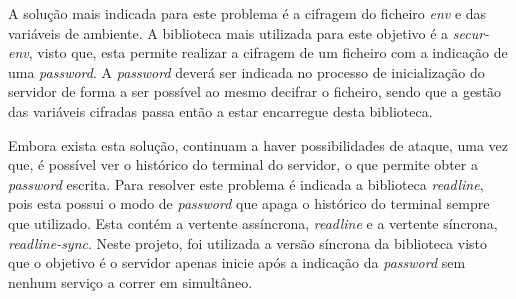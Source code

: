 A solução mais indicada para este problema é a cifragem do ficheiro \textit{env} e das variáveis de ambiente. A biblioteca mais utilizada para este objetivo é a \textit{secur-env}, visto que, esta permite realizar a cifragem de um ficheiro com a indicação de uma \textit{\textit{password}}. A \textit{\textit{password}} deverá ser indicada no processo de inicialização do servidor de forma a ser possível ao mesmo decifrar o ficheiro, sendo que a gestão das variáveis cifradas passa então a estar encarregue desta biblioteca.

Embora exista esta solução, continuam a haver possibilidades de ataque, uma vez que, é possível ver o histórico do terminal do servidor, o que permite obter a \textit{\textit{password}} escrita. Para resolver este problema é indicada a biblioteca \textit{readline}, pois esta possui o modo de \textit{\textit{password}} que apaga o histórico do terminal sempre que utilizado. Esta contém a vertente assíncrona, \textit{readline} e a vertente síncrona, \textit{readline-sync}. Neste projeto, foi utilizada a versão síncrona da biblioteca visto que o objetivo é o servidor apenas inicie após a indicação da \textit{\textit{password}} sem nenhum serviço a correr em simultâneo.